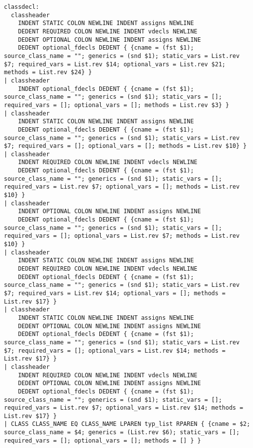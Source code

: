 \documentclass{article}
\begin{document}
\begin{verbatim}
classdecl:
  classheader
    INDENT STATIC COLON NEWLINE INDENT assigns NEWLINE
    DEDENT REQUIRED COLON NEWLINE INDENT vdecls NEWLINE
    DEDENT OPTIONAL COLON NEWLINE INDENT assigns NEWLINE
    DEDENT optional_fdecls DEDENT { {cname = (fst $1); source_class_name = ""; generics = (snd $1); static_vars = List.rev $7; required_vars = List.rev $14; optional_vars = List.rev $21; methods = List.rev $24} }
| classheader
    INDENT optional_fdecls DEDENT { {cname = (fst $1); source_class_name = ""; generics = (snd $1); static_vars = []; required_vars = []; optional_vars = []; methods = List.rev $3} }
| classheader
    INDENT STATIC COLON NEWLINE INDENT assigns NEWLINE
    DEDENT optional_fdecls DEDENT { {cname = (fst $1); source_class_name = ""; generics = (snd $1); static_vars = List.rev $7; required_vars = []; optional_vars = []; methods = List.rev $10} }
| classheader
    INDENT REQUIRED COLON NEWLINE INDENT vdecls NEWLINE
    DEDENT optional_fdecls DEDENT { {cname = (fst $1); source_class_name = ""; generics = (snd $1); static_vars = []; required_vars = List.rev $7; optional_vars = []; methods = List.rev $10} }
| classheader
    INDENT OPTIONAL COLON NEWLINE INDENT assigns NEWLINE
    DEDENT optional_fdecls DEDENT { {cname = (fst $1); source_class_name = ""; generics = (snd $1); static_vars = []; required_vars = []; optional_vars = List.rev $7; methods = List.rev $10} }
| classheader
    INDENT STATIC COLON NEWLINE INDENT assigns NEWLINE
    DEDENT REQUIRED COLON NEWLINE INDENT vdecls NEWLINE
    DEDENT optional_fdecls DEDENT { {cname = (fst $1); source_class_name = ""; generics = (snd $1); static_vars = List.rev $7; required_vars = List.rev $14; optional_vars = []; methods = List.rev $17} }
| classheader
    INDENT STATIC COLON NEWLINE INDENT assigns NEWLINE
    DEDENT OPTIONAL COLON NEWLINE INDENT assigns NEWLINE
    DEDENT optional_fdecls DEDENT { {cname = (fst $1); source_class_name = ""; generics = (snd $1); static_vars = List.rev $7; required_vars = []; optional_vars = List.rev $14; methods = List.rev $17} }
| classheader
    INDENT REQUIRED COLON NEWLINE INDENT vdecls NEWLINE
    DEDENT OPTIONAL COLON NEWLINE INDENT assigns NEWLINE
    DEDENT optional_fdecls DEDENT { {cname = (fst $1); source_class_name = ""; generics = (snd $1); static_vars = []; required_vars = List.rev $7; optional_vars = List.rev $14; methods = List.rev $17} }
| CLASS CLASS_NAME EQ CLASS_NAME LPAREN typ_list RPAREN { {cname = $2; source_class_name = $4; generics = (List.rev $6); static_vars = []; required_vars = []; optional_vars = []; methods = [] } }


\end{verbatim}
\end{document}
